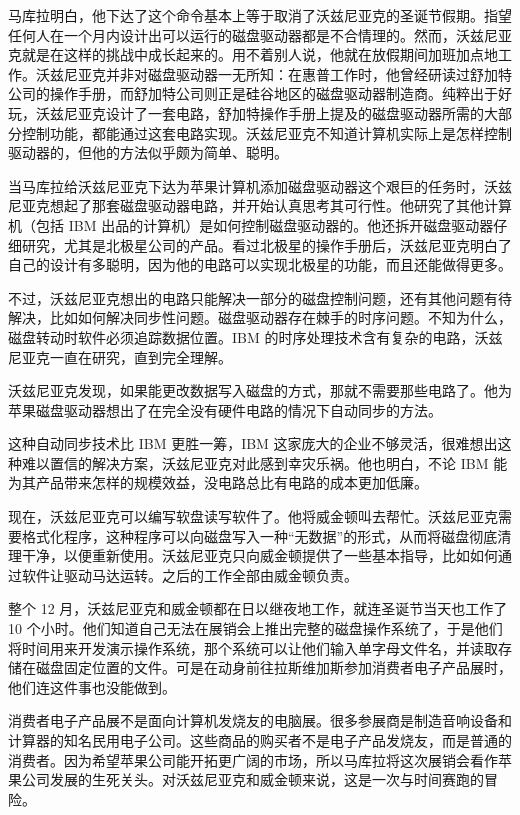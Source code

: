 \documentclass[12pt,UTF8]{ctexbook}
\begin{document}
马库拉明白，他下达了这个命令基本上等于取消了沃兹尼亚克的圣诞节假期。指望任何人在一个月内设计出可以运行的磁盘驱动器都是不合情理的。然而，沃兹尼亚克就是在这样的挑战中成长起来的。用不着别人说，他就在放假期间加班加点地工作。沃兹尼亚克并非对磁盘驱动器一无所知：在惠普工作时，他曾经研读过舒加特公司的操作手册，而舒加特公司则正是硅谷地区的磁盘驱动器制造商。纯粹出于好玩，沃兹尼亚克设计了一套电路，舒加特操作手册上提及的磁盘驱动器所需的大部分控制功能，都能通过这套电路实现。沃兹尼亚克不知道计算机实际上是怎样控制驱动器的，但他的方法似乎颇为简单、聪明。

当马库拉给沃兹尼亚克下达为苹果计算机添加磁盘驱动器这个艰巨的任务时，沃兹尼亚克想起了那套磁盘驱动器电路，并开始认真思考其可行性。他研究了其他计算机（包括 IBM 出品的计算机）是如何控制磁盘驱动器的。他还拆开磁盘驱动器仔细研究，尤其是北极星公司的产品。看过北极星的操作手册后，沃兹尼亚克明白了自己的设计有多聪明，因为他的电路可以实现北极星的功能，而且还能做得更多。

不过，沃兹尼亚克想出的电路只能解决一部分的磁盘控制问题，还有其他问题有待解决，比如如何解决同步性问题。磁盘驱动器存在棘手的时序问题。不知为什么，磁盘转动时软件必须追踪数据位置。IBM 的时序处理技术含有复杂的电路，沃兹尼亚克一直在研究，直到完全理解。

沃兹尼亚克发现，如果能更改数据写入磁盘的方式，那就不需要那些电路了。他为苹果磁盘驱动器想出了在完全没有硬件电路的情况下自动同步的方法。

这种自动同步技术比 IBM 更胜一筹，IBM 这家庞大的企业不够灵活，很难想出这种难以置信的解决方案，沃兹尼亚克对此感到幸灾乐祸。他也明白，不论 IBM 能为其产品带来怎样的规模效益，没电路总比有电路的成本更加低廉。

现在，沃兹尼亚克可以编写软盘读写软件了。他将威金顿叫去帮忙。沃兹尼亚克需要格式化程序，这种程序可以向磁盘写入一种“无数据”的形式，从而将磁盘彻底清理干净，以便重新使用。沃兹尼亚克只向威金顿提供了一些基本指导，比如如何通过软件让驱动马达运转。之后的工作全部由威金顿负责。

整个 12 月，沃兹尼亚克和威金顿都在日以继夜地工作，就连圣诞节当天也工作了 10 个小时。他们知道自己无法在展销会上推出完整的磁盘操作系统了，于是他们将时间用来开发演示操作系统，那个系统可以让他们输入单字母文件名，并读取存储在磁盘固定位置的文件。可是在动身前往拉斯维加斯参加消费者电子产品展时，他们连这件事也没能做到。

消费者电子产品展不是面向计算机发烧友的电脑展。很多参展商是制造音响设备和计算器的知名民用电子公司。这些商品的购买者不是电子产品发烧友，而是普通的消费者。因为希望苹果公司能开拓更广阔的市场，所以马库拉将这次展销会看作苹果公司发展的生死关头。对沃兹尼亚克和威金顿来说，这是一次与时间赛跑的冒险。
\end{document}
